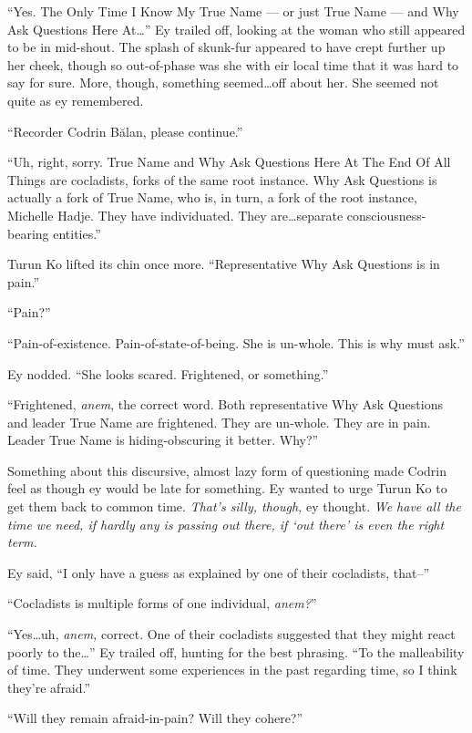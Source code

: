 ``Yes. The Only Time I Know My True Name — or just True Name — and Why Ask Questions Here At\ldots{}'' Ey trailed off, looking at the woman who still appeared to be in mid-shout. The splash of skunk-fur appeared to have crept further up her cheek, though so out-of-phase was she with eir local time that it was hard to say for sure. More, though, something seemed\ldots off about her. She seemed not quite as ey remembered.

``Recorder Codrin Bălan, please continue.''

``Uh, right, sorry. True Name and Why Ask Questions Here At The End Of All Things are cocladists, forks of the same root instance. Why Ask Questions is actually a fork of True Name, who is, in turn, a fork of the root instance, Michelle Hadje. They have individuated. They are\ldots separate consciousness-bearing entities.''

Turun Ko lifted its chin once more. ``Representative Why Ask Questions is in pain.''

``Pain?''

``Pain-of-existence. Pain-of-state-of-being. She is un-whole. This is why must ask.''

Ey nodded. ``She looks scared. Frightened, or something.''

``Frightened, \emph{anem}, the correct word. Both representative Why Ask Questions and leader True Name are frightened. They are un-whole. They are in pain. Leader True Name is hiding-obscuring it better. Why?''

Something about this discursive, almost lazy form of questioning made Codrin feel as though ey would be late for something. Ey wanted to urge Turun Ko to get them back to common time. \emph{That's silly, though,} ey thought. \emph{We have all the time we need, if hardly any is passing out there, if `out there' is even the right term.}

Ey said, ``I only have a guess as explained by one of their cocladists, that--''

``Cocladists is multiple forms of one individual, \emph{anem?}''

``Yes\ldots uh, \emph{anem,} correct. One of their cocladists suggested that they might react poorly to the\ldots{}'' Ey trailed off, hunting for the best phrasing. ``To the malleability of time. They underwent some experiences in the past regarding time, so I think they're afraid.''

``Will they remain afraid-in-pain? Will they cohere?''

